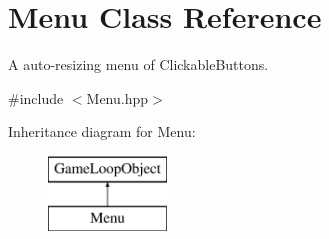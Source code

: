 \hypertarget{class_menu}{}\section{Menu Class Reference}
\label{class_menu}


A auto-\/resizing menu of Clickable\+Buttons.  




{\ttfamily \#include $<$Menu.\+hpp$>$}

Inheritance diagram for Menu\+:\begin{figure}[H]
\begin{center}
\leavevmode
\includegraphics[height=2.000000cm]{class_menu}
\end{center}
\end{figure}

